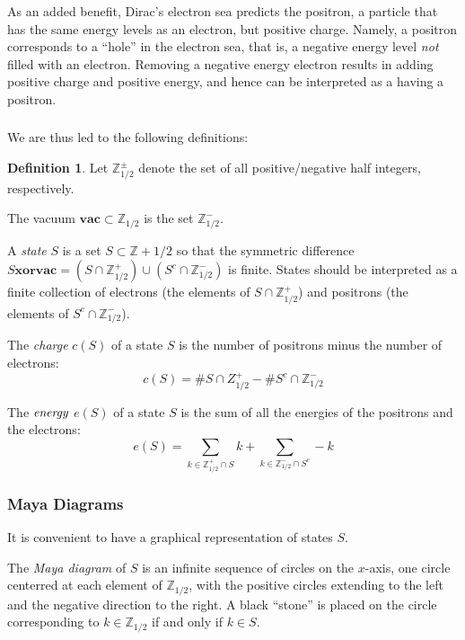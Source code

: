 \documentclass{amsart}[12pt]
\theoremstyle{definition}
\newtheorem{definition}[dummy]{Definition}
\newcommand{\Z}{\mathbb{Z}}
\newcommand{\vac}{\mathbf{vac}}
\begin{document}
As an added benefit, Dirac's electron sea predicts the positron, a particle
that has the same energy levels as an electron, but positive charge.  Namely, a positron corresponds to a ``hole'' in the electron sea, that is, a negative
energy level \emph{not} filled with an electron.  Removing a negative energy electron results in adding positive charge and positive energy, and hence can be interpreted as a having a positron.

\subsubsection{} We are thus led to the following definitions:

\begin{definition} Let $\Z_{1/2}^\pm$ denote the set of all positive/negative half integers, respectively.

The vacuum $\vac\subset \Z_{1/2}$ is the set $\Z_{1/2}^-$.

A \emph{state} $S$ is a set $S\subset\Z+1/2$ so that the symmetric
difference $S \textbf{xor} \vac=(S\cap\Z_{1/2}^+)\cup (S^c\cap\Z_{1/2}^-)$ is finite.  States should be interpreted as a finite collection of electrons (the elements of $S\cap \Z^+_{1/2}$) and positrons (the elements of $S^c\cap \Z^-_{1/2}$).

The \emph{charge} $c(S)$ of a state $S$ is the number of positrons minus the number of electrons:
$$c(S)=\# S\cap Z^+_{1/2} - \# S^c\cap \Z^-_{1/2}$$

The $\emph{energy}$ $e(S)$ of a state $S$ is the sum of all the energies of the positrons and the electrons:
$$e(S)=\sum_{k\in\Z^+_{1/2}\cap S} k +\sum_{k\in\Z^-_{1/2}\cap S^c} -k$$

\end{definition}

\subsubsection{Maya Diagrams}

It is convenient to have a graphical representation of states $S$.

The \emph{Maya diagram} of $S$ is an infinite sequence of circles on the $x$-axis, one circle centerred at each element of $\Z_{1/2}$, with the positive circles extending to the left and the negative direction to the right.  A black ``stone'' is placed on the
circle corresponding to $k\in\Z_{1/2}$ if and only if $k\in S$.
\end{document}
